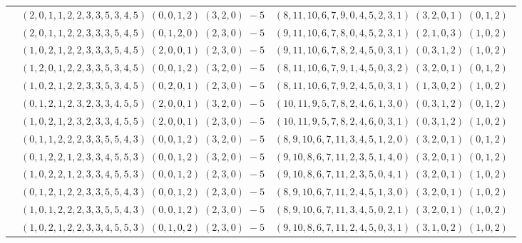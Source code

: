 \documentclass[11pt]{article}
\begin{document}
\begin{longtable}[l]{|c|c|c|}
 \cline{2-3} 
 & $(2 ,0 ,1 ,1 ,2 ,2 ,3 ,3 ,5 ,3 ,4 ,5) \;(0 ,0 ,1 ,2) \;(3 ,2 ,0) \;-5$ & $(8 ,11 ,10 ,6 ,7 ,9 ,0 ,4 ,5 ,2 ,3 ,1) \;(3 ,2 ,0 ,1) \;(0 ,1 ,2) \;$\\ 
 \cline{2-3} 
 & $(2 ,0 ,1 ,1 ,2 ,2 ,3 ,3 ,3 ,5 ,4 ,5) \;(0 ,1 ,2 ,0) \;(2 ,3 ,0) \;-5$ & $(9 ,11 ,10 ,6 ,7 ,8 ,0 ,4 ,5 ,2 ,3 ,1) \;(2 ,1 ,0 ,3) \;(1 ,0 ,2) \;$\\ 
 \cline{2-3} 
 & $(1 ,0 ,2 ,1 ,2 ,2 ,3 ,3 ,3 ,5 ,4 ,5) \;(2 ,0 ,0 ,1) \;(2 ,3 ,0) \;-5$ & $(9 ,11 ,10 ,6 ,7 ,8 ,2 ,4 ,5 ,0 ,3 ,1) \;(0 ,3 ,1 ,2) \;(1 ,0 ,2) \;$\\ 
 \cline{2-3} 
 & $(1 ,2 ,0 ,1 ,2 ,2 ,3 ,3 ,5 ,3 ,4 ,5) \;(0 ,0 ,1 ,2) \;(3 ,2 ,0) \;-5$ & $(8 ,11 ,10 ,6 ,7 ,9 ,1 ,4 ,5 ,0 ,3 ,2) \;(3 ,2 ,0 ,1) \;(0 ,1 ,2) \;$\\ 
 \cline{2-3} 
 & $(1 ,0 ,2 ,1 ,2 ,2 ,3 ,3 ,5 ,3 ,4 ,5) \;(0 ,2 ,0 ,1) \;(2 ,3 ,0) \;-5$ & $(8 ,11 ,10 ,6 ,7 ,9 ,2 ,4 ,5 ,0 ,3 ,1) \;(1 ,3 ,0 ,2) \;(1 ,0 ,2) \;$\\ 
 \cline{2-3} 
 & $(0 ,1 ,2 ,1 ,2 ,3 ,2 ,3 ,3 ,4 ,5 ,5) \;(2 ,0 ,0 ,1) \;(3 ,2 ,0) \;-5$ & $(10 ,11 ,9 ,5 ,7 ,8 ,2 ,4 ,6 ,1 ,3 ,0) \;(0 ,3 ,1 ,2) \;(0 ,1 ,2) \;$\\ 
 \cline{2-3} 
 & $(1 ,0 ,2 ,1 ,2 ,3 ,2 ,3 ,3 ,4 ,5 ,5) \;(2 ,0 ,0 ,1) \;(2 ,3 ,0) \;-5$ & $(10 ,11 ,9 ,5 ,7 ,8 ,2 ,4 ,6 ,0 ,3 ,1) \;(0 ,3 ,1 ,2) \;(1 ,0 ,2) \;$\\ 
 \cline{2-3} 
 & $(0 ,1 ,1 ,2 ,2 ,2 ,3 ,3 ,5 ,5 ,4 ,3) \;(0 ,0 ,1 ,2) \;(3 ,2 ,0) \;-5$ & $(8 ,9 ,10 ,6 ,7 ,11 ,3 ,4 ,5 ,1 ,2 ,0) \;(3 ,2 ,0 ,1) \;(0 ,1 ,2) \;$\\ 
 \cline{2-3} 
 & $(0 ,1 ,2 ,2 ,1 ,2 ,3 ,3 ,4 ,5 ,5 ,3) \;(0 ,0 ,1 ,2) \;(3 ,2 ,0) \;-5$ & $(9 ,10 ,8 ,6 ,7 ,11 ,2 ,3 ,5 ,1 ,4 ,0) \;(3 ,2 ,0 ,1) \;(0 ,1 ,2) \;$\\ 
 \cline{2-3} 
 & $(1 ,0 ,2 ,2 ,1 ,2 ,3 ,3 ,4 ,5 ,5 ,3) \;(0 ,0 ,1 ,2) \;(2 ,3 ,0) \;-5$ & $(9 ,10 ,8 ,6 ,7 ,11 ,2 ,3 ,5 ,0 ,4 ,1) \;(3 ,2 ,0 ,1) \;(1 ,0 ,2) \;$\\ 
 \cline{2-3} 
 & $(0 ,1 ,2 ,1 ,2 ,2 ,3 ,3 ,5 ,5 ,4 ,3) \;(0 ,0 ,1 ,2) \;(2 ,3 ,0) \;-5$ & $(8 ,9 ,10 ,6 ,7 ,11 ,2 ,4 ,5 ,1 ,3 ,0) \;(3 ,2 ,0 ,1) \;(1 ,0 ,2) \;$\\ 
 \cline{2-3} 
 & $(1 ,0 ,1 ,2 ,2 ,2 ,3 ,3 ,5 ,5 ,4 ,3) \;(0 ,0 ,1 ,2) \;(2 ,3 ,0) \;-5$ & $(8 ,9 ,10 ,6 ,7 ,11 ,3 ,4 ,5 ,0 ,2 ,1) \;(3 ,2 ,0 ,1) \;(1 ,0 ,2) \;$\\ 
 \cline{2-3} 
 & $(1 ,0 ,2 ,1 ,2 ,2 ,3 ,3 ,4 ,5 ,5 ,3) \;(0 ,1 ,0 ,2) \;(2 ,3 ,0) \;-5$ & $(9 ,10 ,8 ,6 ,7 ,11 ,2 ,4 ,5 ,0 ,3 ,1) \;(3 ,1 ,0 ,2) \;(1 ,0 ,2) \;$\\ 

\end{longtable}
\end{document}
